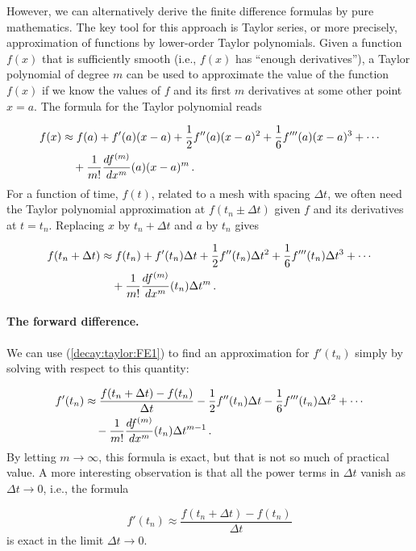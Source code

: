 \documentclass[%
oneside,                 %
final,                   %
10pt]{article}
\begin{document}
However, we can alternatively derive the finite difference formulas by
pure mathematics. The key tool for this approach is Taylor series,
or more precisely, approximation of functions by lower-order
Taylor polynomials. Given a function $f(x)$ that is sufficiently
smooth (i.e., $f(x)$ has ``enough derivatives''),
a Taylor polynomial of degree $m$ can be used to approximate the
value of the function $f(x)$ if we know the values of $f$ and its
first $m$ derivatives at some other point $x=a$. The formula for the
Taylor polynomial reads

\begin{align}
f(x) & \approx f(a) + f'(a)(x-a) + \frac{1}{2}f''(a)(x-a)^2 +
\frac{1}{6}f'''(a)(x-a)^3 + \cdots \nonumber\\ 
 &\quad + \frac{1}{m!}\frac{df^{(m)}}{dx^m}(a)(x-a)^m\thinspace .
\end{align}
For a function of time, $f(t)$, related to a mesh with spacing $\Delta t$,
we often need the Taylor polynomial approximation at $f(t_n\pm\Delta t)$
given $f$ and its derivatives at $t=t_n$. Replacing $x$ by $t_n+\Delta t$ and
$a$ by $t_n$ gives

\begin{align}
f(t_n+\Delta t) & \approx f(t_n) + f'(t_n)\Delta t + \frac{1}{2}f''(t_n)
\Delta t^2 +
\frac{1}{6}f'''(t_n)\Delta t^3 + \cdots\nonumber\\ 
&\quad + \frac{1}{m!}\frac{df^{(m)}}{dx^m}(t_n)\Delta t^m\thinspace .
\label{decay:taylor:FE1}
\end{align}

\paragraph{The forward difference.}
We can use (\ref{decay:taylor:FE1}) to find an approximation for
$f'(t_n)$ simply by solving with respect to this quantity:

\begin{align}
f'(t_n) & \approx  \frac{f(t_n+\Delta t) - f(t_n)}{\Delta t}
- \frac{1}{2}f''(t_n)\Delta t -
\frac{1}{6}f'''(t_n)\Delta t^2 + \cdots\nonumber\\ 
&\quad - \frac{1}{m!}\frac{df^{(m)}}{dx^m}(t_n)\Delta t^{m-1}\thinspace .
\label{decay:taylor:FE2}
\end{align}
By letting $m\rightarrow\infty$, this formula is exact, but that is not
so much of practical value. A more interesting observation is that
all the power terms in $\Delta t$ vanish as $\Delta t\rightarrow 0$, i.e.,
the formula

\begin{equation}
f'(t_n) \approx \frac{f(t_n+\Delta t) - f(t_n)}{\Delta t}
\label{decay:taylor:FE3}
\end{equation}
is exact in the limit $\Delta t\rightarrow 0$.
\end{document}
